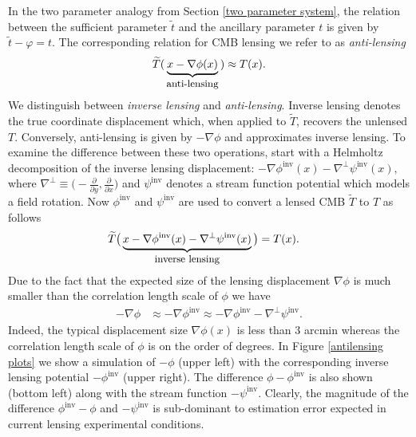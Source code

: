 \documentclass[noinfoline]{imsart}
\begin{document}
In the two parameter analogy from Section \ref{two parameter system},  the relation between the sufficient parameter $\widetilde t$ and the ancillary parameter $t$ is given by $\widetilde t - \varphi = t$. The corresponding relation for CMB lensing we refer to as {\em anti-lensing}
\begin{equation}
\label{antilense}
 \widetilde T(\,\underbrace{x-\nabla\phi(x)}_\text{\small anti-lensing}\,) \approx T(x).%
\end{equation}
We distinguish between {\em inverse lensing} and  {\em anti-lensing}. Inverse lensing denotes the true coordinate displacement which, when applied to  $\widetilde T$, recovers the unlensed $T$. Conversely,  anti-lensing is  given by $-\nabla\phi$ and approximates inverse lensing.  
To examine the difference between these two operations, start with a Helmholtz decomposition of the inverse lensing displacement: $-\nabla \phi^\text{inv}(x) - \nabla^\perp \psi^\text{inv}(x),$  where $\nabla^\perp \equiv \bigr(-\frac{\partial}{\partial y},\frac{\partial}{\partial x} \bigl)$ and  $\psi^\text{inv}$ denotes a stream function potential which models a field rotation. Now $\phi^\text{inv}$ and $\psi^\text{inv}$ are used to convert a lensed CMB $\widetilde T$ to $T$ as follows 
\begin{align*}
\widetilde T\bigl(\,\underbrace{x-\nabla \phi^\text{inv}(x) - \nabla^\perp \psi^\text{inv}(x)}_\text{\small inverse lensing}\,\bigr) &= T(x).
\end{align*}
Due to the fact that the expected size of the lensing displacement $\nabla\phi$ is much smaller than the correlation length scale of $\phi$ we have
\begin{align}
\label{anti approx}
-\nabla\phi &\approx -\nabla\phi^\text{inv} \approx -\nabla\phi^\text{inv}- \nabla^\perp \psi^\text{inv}.
\end{align}
Indeed, the typical displacement size $\nabla \phi(x)$ is less than 3 arcmin whereas the correlation length scale of $\phi$ is on the order of degrees. In Figure \ref{antilensing plots} we show a simulation of  $-\phi$ (upper left) with the corresponding inverse lensing potential $-\phi^\text{inv}$ (upper right). The difference $\phi - \phi^\text{inv}$ is also shown (bottom left) along with the stream function $-\psi^\text{inv}$. Clearly, the magnitude of the difference  $\phi^\text{inv}-\phi$ and $-\psi^\text{inv}$ is sub-dominant to estimation error expected in current lensing experimental conditions. 
\end{document}
